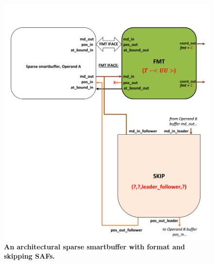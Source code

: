 \begin{figure}[H]
\includegraphics[width=\textwidth]{figures/safinference_build_01concretization.png}
\caption{\textbf{An architectural sparse smartbuffer with format and skipping SAFs.}}
\label{fig:safinference_build_01concretization}
\centering
\end{figure}



